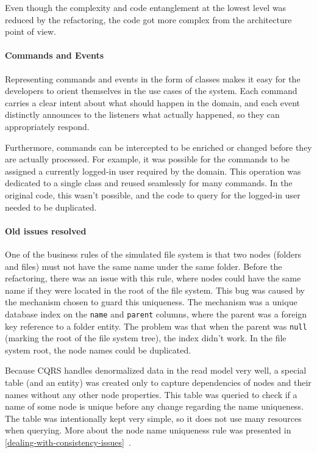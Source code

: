 \documentclass{book}
\begin{document}
Even though the complexity and code entanglement at the lowest level was
reduced by the refactoring, the code got more complex from the
architecture point of view.

\paragraph{Commands and Events}\label{commands-and-events}

Representing commands and events in the form of classes makes it easy
for the developers to orient themselves in the use cases of the system.
Each command carries a clear intent about what should happen in the
domain, and each event distinctly announces to the listeners what
actually happened, so they can appropriately respond.

Furthermore, commands can be intercepted to be enriched or changed
before they are actually processed. For example, it was possible for the
commands to be assigned a currently logged-in user required by the
domain. This operation was dedicated to a single class and reused
seamlessly for many commands. In the original code, this wasn't
possible, and the code to query for the logged-in user needed to be
duplicated.

\paragraph{Old issues resolved}\label{old-issues-resolved}

One of the business rules of the simulated file system is that two nodes
(folders and files) must not have the same name under the same folder.
Before the refactoring, there was an issue with this rule, where nodes
could have the same name if they were located in the root of the file
system. This bug was caused by the mechanism chosen to guard this
uniqueness. The mechanism was a unique database index on the
\texttt{name} and \texttt{parent} columns, where the parent was a
foreign key reference to a folder entity. The problem was that when the
parent was \texttt{null} (marking the root of the file system tree), the
index didn't work. In the file system root, the node names could be
duplicated.

Because CQRS handles denormalized data in the read model very well, a
special table (and an entity) was created only to capture dependencies
of nodes and their names without any other node properties. This table
was queried to check if a name of some node is unique before any change
regarding the name uniqueness. The table was intentionally kept very
simple, so it does not use many resources when querying. More about the
node name uniqueness rule was presented in
\ref{dealing-with-consistency-issues}~.
\end{document}
